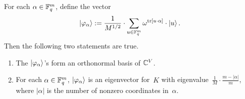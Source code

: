\begin{proposition}\label{prop:eigenvectors}
For each $\alpha \in \mathbb F_q^m$, define the vector
\begin{equation*}
\ket{\varphi_\alpha} := \frac{1}{M^{1/2}} \cdot \sum_{u \in \mathbb F_q^m} \omega^{\mathrm{tr}[u \cdot \alpha]}\cdot \ket{u}.
\end{equation*}
Then the following two statements are true.
\begin{enumerate}
\item The $\ket{\varphi_\alpha}$'s form an orthonormal basis of $\mathbb C^V$.\label{item:orthonormal}
\item For each $\alpha \in \mathbb F_q^m$, $\ket{\varphi_\alpha}$ is an eigenvector for~$K$ with eigenvalue~$\frac{1}{M} \cdot  \frac{m - |\alpha|}{m}$,
	where $|\alpha|$ is the number of nonzero coordinates in~$\alpha$.\label{item:eigenvector}
\end{enumerate}
\end{proposition}

